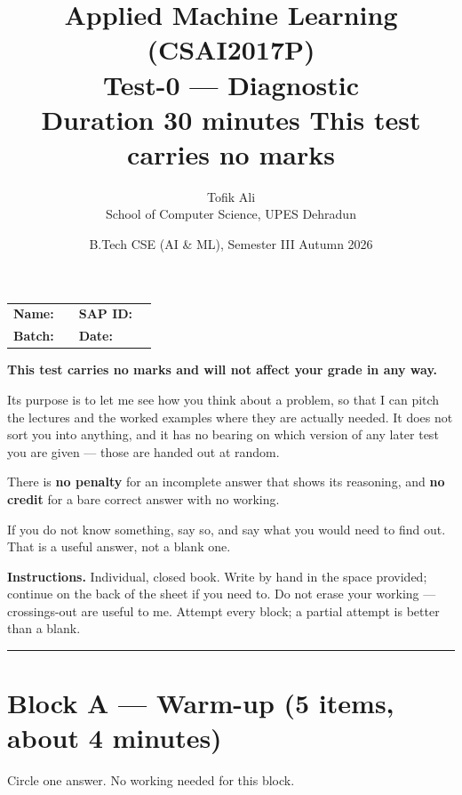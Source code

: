 \documentclass[11pt]{article}
\title{Applied Machine Learning (CSAI2017P)\\Test-0 --- Diagnostic\\
       \large Duration 30 minutes \quad\textbullet\quad \textbf{This test carries no marks}}
\author{Tofik Ali \\ School of Computer Science, UPES Dehradun}
\date{B.Tech CSE (AI \& ML), Semester III \quad\textbullet\quad Autumn 2026}
\begin{document}
\maketitle
\thispagestyle{empty}

\noindent
\begin{tabular}{@{}p{2.4cm}p{5.0cm}p{2.0cm}p{4.6cm}@{}}
\textbf{Name:} & \hrulefill & \textbf{SAP ID:} & \hrulefill \\[10pt]
\textbf{Batch:} & \hrulefill & \textbf{Date:} & \hrulefill \\
\end{tabular}

\vspace{0.6em}

\begin{tcolorbox}[colback=gray!5,colframe=gray!55,title=\textbf{Read this first}]
\textbf{This test carries no marks and will not affect your grade in any way.}

Its purpose is to let me see how you think about a problem, so that I can pitch the lectures and the
worked examples where they are actually needed. It does not sort you into anything, and it has no
bearing on which version of any later test you are given --- those are handed out at random.

There is \textbf{no penalty} for an incomplete answer that shows its reasoning, and \textbf{no credit}
for a bare correct answer with no working.

If you do not know something, say so, and say what you would need to find out. That is a useful
answer, not a blank one.
\end{tcolorbox}

\noindent\textbf{Instructions.} Individual, closed book. Write by hand in the space provided; continue
on the back of the sheet if you need to. Do not erase your working --- crossings-out are useful to me.
Attempt every block; a partial attempt is better than a blank.

\bigskip\hrule\bigskip

\section*{Block A --- Warm-up \hfill \normalfont\small(5 items, about 4 minutes)}
Circle one answer. No working needed for this block.
\end{document}

